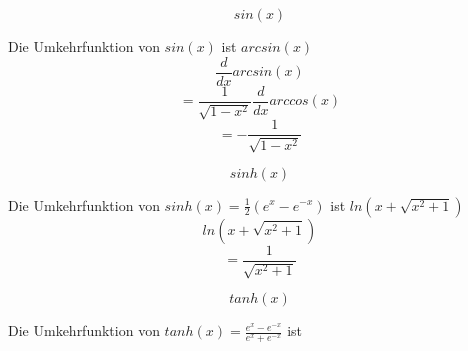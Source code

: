 \begin{minipage}[t]{0.33\textwidth}
    \begin{subtask}
        \[sin(x)\]
    \end{subtask}
    \begin{solution}
        Die Umkehrfunktion von \(sin(x)\) ist \(arcsin(x)\) \\
        \[\frac{d}{dx}arcsin(x) \]
        \[=\frac{1}{\sqrt{1-x^2}}\frac{d}{dx}arccos(x)\]
        \[=-\frac{1}{\sqrt{1-x^2}}\]
    \end{solution}
\end{minipage} %
\begin{minipage}[t]{0.33\textwidth}
    \begin{subtask}
        \[sinh(x)\]
    \end{subtask}
    \begin{solution}
        Die Umkehrfunktion von \(sinh(x)=\frac{1}{2}(e^x-e^{-x})\) ist \(ln(x+\sqrt{x^2+1})\)
        \[ln(x+\sqrt{x^2+1})\]
        \[= \frac{1}{\sqrt{x^2+1}}\]
    \end{solution}
\end{minipage} %
\begin{minipage}[t]{0.33\textwidth}
    \begin{subtask}
        \[tanh(x)\]
    \end{subtask}
    \begin{solution}
        Die Umkehrfunktion von \(tanh(x)=\frac{e^x-e^{-x}}{e^x+e^{-x}}\) ist \(\)
    \end{solution}
\end{minipage}